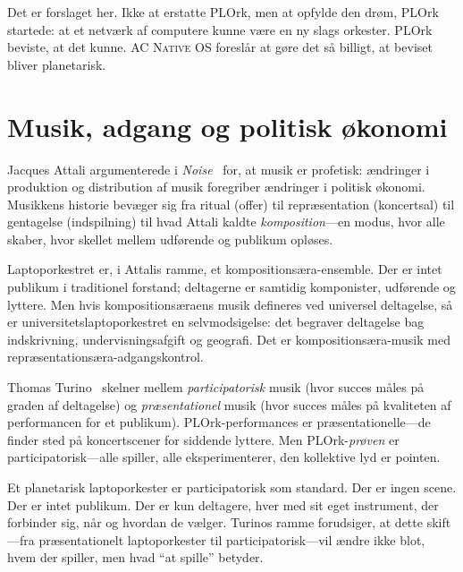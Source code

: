 \documentclass[10pt,letterpaper,twocolumn]{article}
\newcommand{\acos}{\textsc{AC Native OS}}
\begin{document}
Det er forslaget her. Ikke at erstatte PLOrk, men at opfylde den dr{\o}m, PLOrk startede: at et netv{\ae}rk af computere kunne v{\ae}re en ny slags orkester. PLOrk beviste, at det kunne. \acos{} foresl{\aa}r at g{\o}re det s{\aa} billigt, at beviset bliver planetarisk.


\section{Musik, adgang og politisk {\o}konomi}
\label{sec:theory}

Jacques Attali argumenterede i \emph{Noise}~\citep{attali1985noise} for, at musik er profetisk: {\ae}ndringer i produktion og distribution af musik foregriber {\ae}ndringer i politisk {\o}konomi. Musikkens historie bev{\ae}ger sig fra ritual (offer) til repr{\ae}sentation (koncertsal) til gentagelse (indspilning) til hvad Attali kaldte \emph{komposition}---en modus, hvor alle skaber, hvor skellet mellem udf{\o}rende og publikum opl{\o}ses.

Laptoporkestret er, i Attalis ramme, et kompositions{\ae}ra-ensemble. Der er intet publikum i traditionel forstand; deltagerne er samtidig komponister, udf{\o}rende og lyttere. Men hvis kompositions{\ae}raens musik defineres ved universel deltagelse, s{\aa} er universitetslaptoporkestret en selvmodsigelse: det begraver deltagelse bag indskrivning, undervisningsafgift og geografi. Det er kompositions{\ae}ra-musik med repr{\ae}sentations{\ae}ra-adgangskontrol.

Thomas Turino~\citep{turino2008music} skelner mellem \emph{participatorisk} musik (hvor succes m{\aa}les p{\aa} graden af deltagelse) og \emph{pr{\ae}sentationel} musik (hvor succes m{\aa}les p{\aa} kvaliteten af performancen for et publikum). PLOrk-performances er pr{\ae}sentationelle---de finder sted p{\aa} koncertscener for siddende lyttere. Men PLOrk-\emph{pr{\o}ven} er participatorisk---alle spiller, alle eksperimenterer, den kollektive lyd er pointen.

Et planetarisk laptoporkester er participatorisk som standard. Der er ingen scene. Der er intet publikum. Der er kun deltagere, hver med sit eget instrument, der forbinder sig, n{\aa}r og hvordan de v{\ae}lger. Turinos ramme forudsiger, at dette skift---fra pr{\ae}sentationelt laptoporkester til participatorisk---vil {\ae}ndre ikke blot, hvem der spiller, men hvad ``at spille'' betyder.
\end{document}
